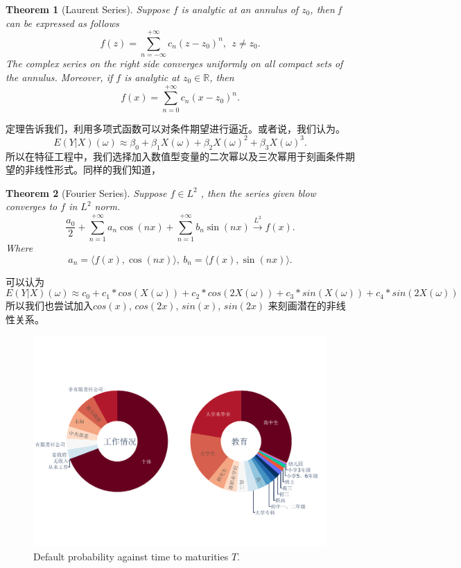 \documentclass{article}
\newtheorem{Theorem}{Theorem}[section]
\begin{document}
\begin{Theorem}[Laurent Series]{\label{LS}} 
Suppose $f$ is analytic at an annulus of $z_0$, then f can be expressed as follows
$$
f(z) = \sum_{n=-\infty}^{+\infty}c_n(z-z_0)^n, \ \  z\neq z_0.
$$
The complex series on the right side converges uniformly on all compact sets of the annulus. Moreover, if $f$ is analytic at $z_0\in\mathbb{R}$, then 
$$
f(x) = \sum_{n=0}^{+\infty}c_n(x-z_0)^n.
$$
\end{Theorem}
定理告诉我们，利用多项式函数可以对条件期望进行逼近。或者说，我们认为。
$$
E(Y|X)(\omega) \approx \beta_0 + \beta_1X(\omega) + \beta_2X(\omega)^2 + \beta_3X(\omega)^3.
$$
所以在特征工程中，我们选择加入数值型变量的二次幂以及三次幂用于刻画条件期望的非线性形式。同样的我们知道，
\begin{Theorem}[Fourier Series]{\label{FS}} 
Suppose $f\in L^2$ , then the series given blow converges to $f$ in $L^2$ norm. 
$$
\frac{a_0}{2} + \sum_{n=1}^{+\infty}a_n\cos(nx)+\sum_{n=1}^{+\infty}b_n\sin(nx) \stackrel{L^2}{\rightarrow} f(x).
$$
Where 
$$
a_n = \langle f(x),\cos(nx)\rangle, \ b_n = \langle f(x),\sin(nx)\rangle.
$$
\end{Theorem}
可以认为
$$
E(Y|X)(\omega) \approx c_0 + c_1*cos(X(\omega))+c_2*cos(2X(\omega))+c_3*sin(X(\omega))+c_4*sin(2X(\omega))
$$
所以我们也尝试加入$cos(x)$, $cos(2x)$, $sin(x)$, $sin(2x)$ 来刻画潜在的非线性关系。
\begin{figure}
	\begin{center}
		\makeatletter
		\def\@captype{figure}
		\makeatother
		\includegraphics[width=5.0in]{images/working_education.pdf}
		\caption{Default probability against time to maturities $T$. \label{DP}}
	\end{center}
\end{figure}
\end{document}
